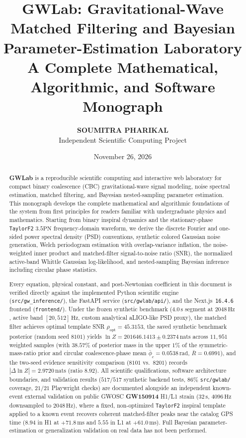 \documentclass[11pt,a4paper]{report}
\title{
    \vspace{-1cm}
    {\Large\textbf{GWLab: Gravitational-Wave Matched Filtering and Bayesian Parameter-Estimation Laboratory}}\\[0.6em]
    {\large A Complete Mathematical, Algorithmic, and Software Monograph}
}
\author{\textbf{SOUMITRA PHARIKAL}\\[0.25em]
\normalsize Independent Scientific Computing Project}
\date{November 26, 2026}
\begin{document}
\maketitle
\thispagestyle{empty}

\begin{abstract}
\textbf{GWLab} is a reproducible scientific computing and interactive web laboratory for compact binary coalescence (CBC) gravitational-wave signal modeling, noise spectral estimation, matched filtering, and Bayesian nested-sampling parameter estimation. This monograph develops the complete mathematical and algorithmic foundations of the system from first principles for readers familiar with undergraduate physics and mathematics. Starting from binary inspiral dynamics and the stationary-phase \texttt{TaylorF2} $3.5\mathrm{PN}$ frequency-domain waveform, we derive the discrete Fourier and one-sided power spectral density (PSD) conventions, synthetic colored Gaussian noise generation, Welch periodogram estimation with overlap-variance inflation, the noise-weighted inner product and matched-filter signal-to-noise ratio (SNR), the normalized active-band Whittle Gaussian log-likelihood, and nested-sampling Bayesian inference including circular phase statistics.

Every equation, physical constant, and post-Newtonian coefficient in this document is verified directly against the implemented Python scientific engine (\texttt{src/gw\_inference/}), the FastAPI service (\texttt{src/gwlab/api/}), and the Next.js~\texttt{16.4.6} frontend (\texttt{frontend/}). Under the frozen synthetic benchmark ($4.0\,\mathrm{s}$ segment at $2048\,\mathrm{Hz}$, active band $[20, 512]\,\mathrm{Hz}$, custom analytical aLIGO-like PSD proxy), the matched filter achieves optimal template SNR $\rho_{\mathrm{opt}} = 45.3153$, the saved synthetic benchmark posterior (random seed $8101$) yields $\ln Z = 201646.1413 \pm 0.2374\,\mathrm{nats}$ across $11{,}951$ weighted samples (with $38.57\%$ of posterior mass in the upper $1\%$ of the symmetric-mass-ratio prior and circular coalescence-phase mean $\bar{\phi}_c = 0.0538\,\mathrm{rad}$, $\bar{R} = 0.6991$), and the two-seed evidence sensitivity comparison ($8101$ vs.\ $8201$) records $|\Delta \ln Z| = 2.9720\,\mathrm{nats}$ (ratio $8.92$). All scientific qualifications, software architecture boundaries, and validation results ($517/517$ synthetic backend tests, $86\%$ \texttt{src/gwlab/} coverage, $21/21$ Playwright checks) are documented alongside an independent known-event external validation on public GWOSC \textbf{GW150914} H1/L1 strain ($32\,\mathrm{s}$, $4096\,\mathrm{Hz}$ downsampled to $2048\,\mathrm{Hz}$), where a fixed, non-optimized \texttt{TaylorF2} inspiral template applied to a known event recovers coherent matched-filter peaks near the catalog GPS time ($8.94$ in H1 at $+71.8\,\mathrm{ms}$ and $5.55$ in L1 at $+61.0\,\mathrm{ms}$). Full Bayesian parameter-estimation or generalization validation on real data has not been performed.
\end{abstract}
\end{document}
